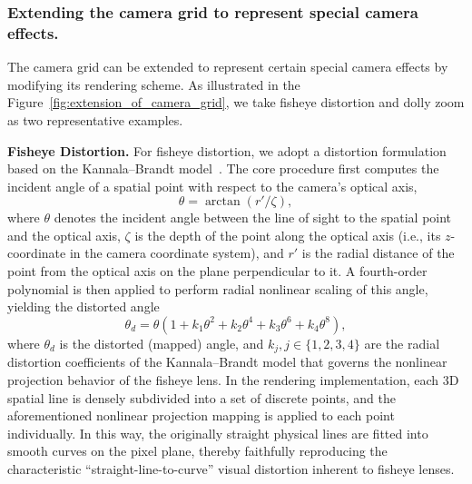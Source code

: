 \documentclass{llmxive}
\begin{document}
\subsubsection{Extending the camera grid to represent special camera effects.}
The camera grid can be extended to represent certain special camera effects by modifying its rendering scheme. As illustrated in the Figure~\ref{fig:extension_of_camera_grid}, we take fisheye distortion and dolly zoom as two representative examples.

\textbf{Fisheye Distortion.}
For fisheye distortion, we adopt a distortion formulation based on the Kannala--Brandt model~\cite{kannala2006generic}. The core procedure first computes the incident angle of a spatial point with respect to the camera's optical axis,
\begin{equation}
    \theta = \arctan(r' / \zeta),
\end{equation}
where $\theta$ denotes the incident angle between the line of sight to the spatial point and the optical axis, $\zeta$ is the depth of the point along the optical axis (i.e., its $z$-coordinate in the camera coordinate system), and $r'$ is the radial distance of the point from the optical axis on the plane perpendicular to it. A fourth-order polynomial is then applied to perform radial nonlinear scaling of this angle, yielding the distorted angle
\begin{equation}
    \theta_d = \theta\left(1 + k_1\theta^2 + k_2\theta^4 
    + k_3\theta^6 + k_4\theta^8\right),
\end{equation}
where $\theta_d$ is the distorted (mapped) angle, and 
$k_j, j\in\{1,2,3,4\}$ are the radial distortion coefficients of the 
Kannala--Brandt model that governs the nonlinear projection behavior of the fisheye lens. In the rendering implementation, each 3D spatial line is densely subdivided into a set of discrete points, and the aforementioned nonlinear projection mapping is applied to each point individually. In this way, the originally straight physical lines are fitted into smooth curves on the pixel plane, thereby faithfully reproducing the characteristic ``straight-line-to-curve'' visual distortion inherent to fisheye lenses.
\end{document}
